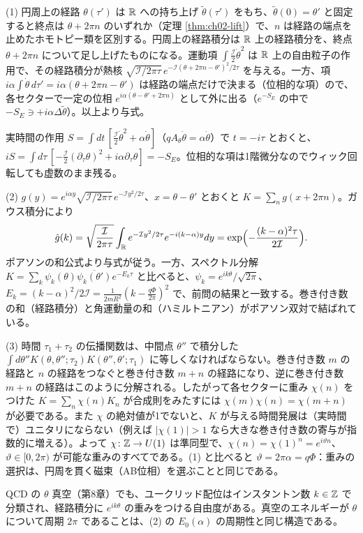 \begin{solution}
(1) 円周上の経路 $\theta(\tau')$ は $\mathbb{R}$ への持ち上げ $\tilde\theta(\tau')$ をもち、$\tilde\theta(0)=\theta'$ と固定すると終点は $\theta+2\pi n$ のいずれか（定理 \ref{thm:ch02-lift}）で、$n$ は経路の端点を止めたホモトピー類を区別する。円周上の経路積分は $\mathbb{R}$ 上の経路積分を、終点 $\theta+2\pi n$ について足し上げたものになる。運動項 $\int\frac{\mathcal I}{2}\dot\theta^2$ は $\mathbb{R}$ 上の自由粒子の作用で、その経路積分が熱核 $\sqrt{\mathcal I/2\pi\tau}\,e^{-\mathcal I(\theta+2\pi n-\theta')^2/2\tau}$ を与える。一方、項 $i\alpha\int\dot\theta\,d\tau'=i\alpha(\theta+2\pi n-\theta')$ は経路の端点だけで決まる（位相的な項）ので、各セクターで一定の位相 $e^{i\alpha(\theta-\theta'+2\pi n)}$ として外に出る（$e^{-S_E}$ の中で $-S_E\ni+i\alpha\Delta\tilde\theta$）。以上より与式。

\begin{note}
実時間の作用 $S=\int dt\,[\tfrac{\mathcal I}{2}\dot\theta^2+\alpha\dot\theta]$（$qA_\theta\dot\theta=\alpha\dot\theta$）で $t=-i\tau$ とおくと、$iS=\int d\tau\,[-\tfrac{\mathcal I}{2}(\partial_\tau\theta)^2+i\alpha\partial_\tau\theta]=-S_E$。位相的な項は1階微分なのでウィック回転しても虚数のまま残る。
\end{note}

(2) $g(y)=e^{i\alpha y}\sqrt{\mathcal I/2\pi\tau}\,e^{-\mathcal Iy^2/2\tau}$、$x=\theta-\theta'$ とおくと $K=\sum_ng(x+2\pi n)$。ガウス積分により
\[
\hat g(k)=\sqrt{\frac{\mathcal I}{2\pi\tau}}\int_{\mathbb{R}} e^{-\mathcal Iy^2/2\tau}e^{-i(k-\alpha)y}dy=\exp\Bigl(-\frac{(k-\alpha)^2\tau}{2\mathcal I}\Bigr).
\]
ポアソンの和公式より与式が従う。一方、スペクトル分解 $K=\sum_k\psi_k(\theta)\overline{\psi_k(\theta')}e^{-E_k\tau}$ と比べると、$\psi_k=e^{ik\theta}/\sqrt{2\pi}$、$E_k=(k-\alpha)^2/2\mathcal I=\frac{1}{2mR^2}(k-\frac{q\Phi}{2\pi})^2$ で、前問の結果と一致する。巻き付き数の和（経路積分）と角運動量の和（ハミルトニアン）がポアソン双対で結ばれている。

(3) 時間 $\tau_1+\tau_2$ の伝播関数は、中間点 $\theta''$ で積分した $\int d\theta''K(\theta,\theta'';\tau_2)K(\theta'',\theta';\tau_1)$ に等しくなければならない。巻き付き数 $m$ の経路と $n$ の経路をつなぐと巻き付き数 $m+n$ の経路になり、逆に巻き付き数 $m+n$ の経路はこのように分解される。したがって各セクターに重み $\chi(n)$ をつけた $K=\sum_n\chi(n)K_n$ が合成則をみたすには $\chi(m)\chi(n)=\chi(m+n)$ が必要である。また $\chi$ の絶対値が1でないと、$K$ が与える時間発展は（実時間で）ユニタリにならない（例えば $\lvert\chi(1)\rvert>1$ なら大きな巻き付き数の寄与が指数的に増える）。よって $\chi\colon\mathbb{Z}\to U(1)$ は準同型で、$\chi(n)=\chi(1)^n=e^{i\vartheta n}$、$\vartheta\in[0,2\pi)$ が可能な重みのすべてである。(1) と比べると $\vartheta=2\pi\alpha=q\Phi$：重みの選択は、円周を貫く磁束（AB位相）を選ぶことと同じである。

QCD の $\theta$ 真空（第8章）でも、ユークリッド配位はインスタントン数 $k\in\mathbb{Z}$ で分類され、経路積分に $e^{ik\theta}$ の重みをつける自由度がある。真空のエネルギーが $\theta$ について周期 $2\pi$ であることは、(2) の $E_0(\alpha)$ の周期性と同じ構造である。
\end{solution}

